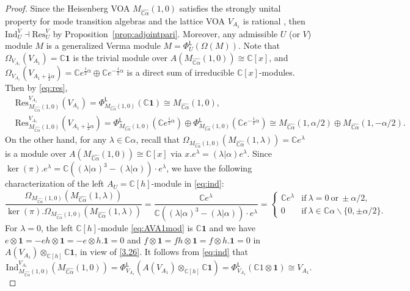 \documentclass[12pt,a4paper,reqno]{amsart}
\numberwithin{equation}{section}
\numberwithin{equation}{section}
\theoremstyle{definition}
\def \C {\mathbb{C}}
\def\la{\lambda}
\def \al{\alpha}
\def \op {\oplus}
\def \vac {\mathbf{1}}
\def\Res{\mathrm{Res}}
\def \bs {\backslash}
\def\L{\mathcal{L}}
\def\o{\otimes}
\def\Om{\Omega}
\def\L{\mathsf{L}}
\def\L{\mathsf{L}}
\begin{document}
	\begin{proof}
		Since the Heisenberg VOA $M_{\widehat{\C\al}}(1,0)$ satisfies the strongly unital property for mode transition algebras \cite[Proposition 7.2.1]{DGK23} and the lattice VOA $V_{A_1}$ is rational \cite{D}, then $\mathrm{Ind}_U^V\dashv \Res^V_U$ by Proposition~\ref{prop:adjointpari}. Moreover, any admissible $U$ (or $V$) module $M$ is a generalized Verma module $M=\Phi^\L_U(\Om(M))$. Note that $\Om_{V_{A_1}}(V_{A_1})=\C\vac$ is the trivial module over $A(M_{\widehat{\C\al}}(1,0))\cong \C[x]$,  and $\Om_{V_{A_1}}(V_{A_1+\frac{1}{2}\al})=\C e^{\frac{1}{2}\al}\op \C e^{-\frac{1}{2}\al}$ is a direct sum of irreducible $\C[x]$-modules. Then by \eqref{eq:res}, 
		\begin{align*}
			&\Res^{V_{A_1}}_{M_{\widehat{\C\al}}(1,0)}(V_{A_1})=\Phi^\L_{M_{\widehat{\C\al}}(1,0)}(\C\vac)\cong M_{\widehat{\C\al}}(1,0),\\
			&\Res^{V_{A_1}}_{M_{\widehat{\C\al}}(1,0)}(V_{A_1+\frac{1}{2}\al})=\Phi^\L_{M_{\widehat{\C\al}}(1,0)}(\C e^{\frac{1}{2}\al})\op \Phi^\L_{M_{\widehat{\C\al}}(1,0)}(\C e^{-\frac{1}{2}\al})\cong M_{\widehat{\C\al}}(1,\al/2)\op M_{\widehat{\C\al}}(1,-\al/2).
		\end{align*}
		On the other hand, for any $\la\in \C\al$, recall that $\Om_{M_{\widehat{\C\al}}(1,0)}(M_{\widehat{\C\al}}(1,\la))=\C e^\la$ is a module over $A(M_{\widehat{\C\al}}(1,0))\cong \C[x]$ via $x.e^\la=(\la|\al)e^\la$. Since $\ker(\pi). e^\la=\C ((\la|\al)^3-(\la|\al))\cdot e^\la$, we have the following characterization of the left $A_U=\C[h]$-module in \eqref{eq:ind}: 
		\begin{equation}\label{eq:AVA1mod}
			\frac{\Om_{M_{\widehat{\C\al}}(1,0)}(M_{\widehat{\C\al}}(1,\la))}{\ker(\pi).\Om_{M_{\widehat{\C\al}}(1,0)}(M_{\widehat{\C\al}}(1,\la))}=\frac{\C e^\la}{\C ((\la|\al)^3-(\la|\al))\cdot e^\la}=\begin{cases}
				\C e^\la& \mathrm{if}\ \la=0\ \mathrm{or}\ \pm\al/2,\\
				0&\mathrm{if}\ \la\in \C\al\bs\{0,\pm\al/2\}. 
			\end{cases}
		\end{equation}
		For $\la=0$, the left $\C[h]$-module \eqref{eq:AVA1mod} is $\C \vac$ and we have $e\o \vac=-eh\o \vac=-e\o h.\vac=0$ and $f\o \vac=fh\o\vac=f\o h.\vac=0$  in $A(V_{A_1})\o_{\C[h]}\C\vac$, in view of \eqref{3.26}. It follows from \eqref{eq:ind} that 
		$$\mathrm{Ind}_{M_{\widehat{\C\al}}(1,0)}^{V_{A_1}} (M_{\widehat{\C\al}}(1,0))=\Phi_{V_{A_1}}^\L(A(V_{A_1})\o_{\C[h]}\C\vac)=\Phi_{V_{A_1}}^\L(\C 1\o\vac)\cong V_{A_1}.$$

\end{proof}
\end{document}
